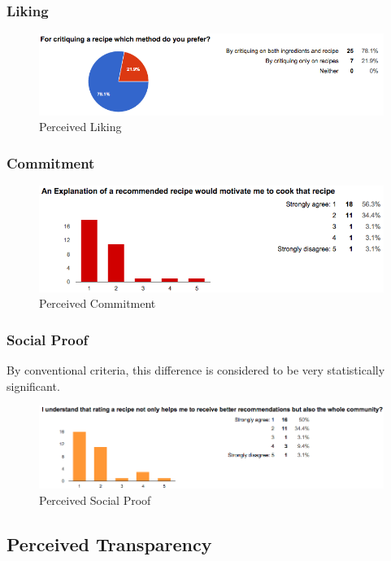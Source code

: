 \subsubsection{Liking}

\begin{figure}
	\centering
	\includegraphics[width=0.7\linewidth]{figures/ch5_stat_liking.png}
	\caption{Perceived Liking}
	\label{fig:ch5_stat_liking}
\end{figure}

\subsubsection{Commitment}

\begin{figure}
	\centering
	\includegraphics[width=0.7\linewidth]{figures/ch5_stat_commitment}
	\caption{Perceived Commitment}
	\label{fig:ch5_commitment}
\end{figure}

\subsubsection{Social Proof}
By conventional criteria, this difference is considered to be very statistically significant. 
\begin{figure}
\centering
\includegraphics[width=0.7\linewidth]{figures/ch5_stat_social_proof.png}
\caption{Perceived Social Proof}
\label{fig:ch5_stat_social_proof}
\end{figure}

\subsection{Perceived Transparency}

